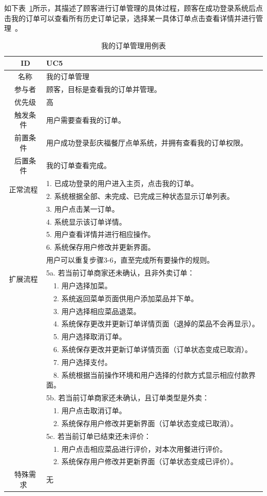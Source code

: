 如下表~\ref{table:uc4}所示，其描述了顾客进行订单管理的具体过程，顾客在成功登录系统后点击我的订单可以查看所有历史订单记录，选择某一具体订单点击查看详情并进行管理~\cite{carroll2011system}。

\begin{table}[htbp!]
  \footnotesize
  \centering
  \caption{我的订单管理用例表}
  \vspace{2mm}
  \begin{tabular}{cp{11.5cm}}
   \hline
   \ ID & UC5 \\ 
   \hline
   \ 名称 & 我的订单管理 \\ 
   \hline
   \ 参与者 & 顾客，目标是查看我的订单并管理。 \\ 
   \hline
   \ 优先级 & 高 \\ 
   \hline
   \ 触发条件 & 用户需要查看我的订单。 \\ 
   \hline
   \ 前置条件 & 用户成功登录彭庆福餐厅点单系统，并拥有查看我的订单权限。 \\ 
   \hline
   \ 后置条件 & 我的订单查看完成。 \\ 
   \hline
   \multirow{2}{*}{正常流程}
    & 1.	已成功登录的用户进入主页，点击我的订单。\\
    & 2.	系统根据全部、未完成、已完成三种状态显示订单列表。\\
    & 3.	用户点击某一订单。\\
    & 4.	系统显示该订单详情。\\
    & 5.  用户查看详情并进行相应操作。\\
    & 6.  系统保存用户修改并更新界面。\\
    & 用户可以重复步骤3-6，直至完成所有要操作的规则。\\
   \hline
   \multirow{2}{*}{扩展流程}
    & 5a. 若当前订单商家还未确认，且非外卖订单：\\
    & ~~1.	用户选择加菜。\\
    & ~~2.	系统返回菜单页面供用户添加菜品并下单。\\
    & ~~3.	用户选择相应菜品退菜。\\
    & ~~4.	系统保存更改并更新订单详情页面（退掉的菜品不会再显示）。\\
    & ~~5.	用户选择取消订单。\\
    & ~~6.	系统保存更改并更新订单详情页面（订单状态变成已取消）。\\
    & ~~7.	用户选择支付。\\
    & ~~8.	系统根据当前操作环境和用户选择的付款方式显示相应付款界面。\\
    & 5b. 若当前订单商家还未确认，且订单类型是外卖：\\
    & ~~1.	用户点击取消订单。\\
    & ~~2.	系统保存用户修改并更新界面（订单状态变成已取消）。\\
    & 5c. 若当前订单已结束还未评价：\\
    & ~~1.	用户点击相应菜品进行评价，对本次用餐进行评价。\\
    & ~~2.	系统保存用户修改并更新界面（订单状态变成已评价）。\\
  \hline
  \ 特殊需求 & 无 \\ 
  \hline
  \end{tabular}
  \label{table:uc4}
\end{table}

